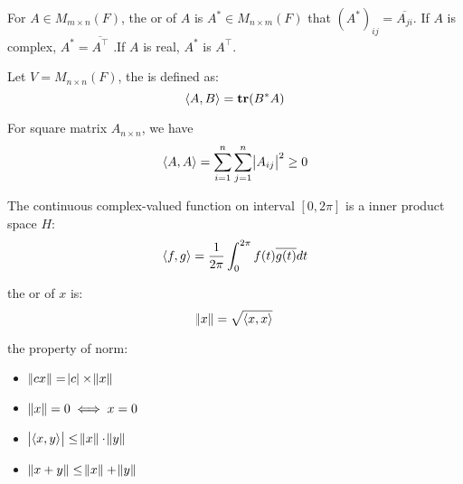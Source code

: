\begin{definition}
	For $A \in M_{m \times n}(F)$, the  or  of $A$ is $A^* \in M_{n \times m}(F)$ that $(A^*)_{ij} = \overline{A_{ji}}$. If $A$ is complex, $A^* = \overline{A^\top}$ .If $A$ is real, $A^*$ is $A^\top$.
\end{definition}

\begin{definition}
    Let $V=M_{n \times n} (F)$, the  is defined as:
    \begin{equation}
        \left\langle \displaystyle A, B \right\rangle = \displaystyle \mathbf{tr}( B^* A )
    \end{equation}
\end{definition}

\begin{theorem}
    For square matrix $A_{n \times n}$, we have 
    \begin{equation}
        \left\langle \displaystyle A, A \right\rangle = \sum_{i=1}^n \sum_{j=1}^n \abs{A_{ij}}^2 \geq 0
    \end{equation}
\end{theorem}


\begin{definition}\label{hinnerproductspace}
	The continuous complex-valued function on interval $[0, 2\pi]$ is a inner product space $H$:
	\begin{equation}
		\left\langle \displaystyle f, g \right\rangle = \frac{1}{2\pi} \int_{0}^{2\pi} f(t) \overline{g(t)} dt
	\end{equation}
\end{definition}


\begin{definition}
	the  or  of $x$ is:
	\begin{equation}
	    \norm{x} = \sqrt{\left\langle \displaystyle x, x \right\rangle}
	\end{equation}
\end{definition}

\begin{theorem}
	the property of norm:
	\begin{itemize}
		\item $\norm{cx} = \abs{c} \times \norm{x}$
		\item $\norm{x} = 0 \iff x = 0$
		\item {} $\abs{\left\langle \displaystyle x, y \right\rangle} \leq \norm{x} \cdot \norm{y}$
		\item {} $\norm{x+y} \leq \norm{x} + \norm{y}$
	\end{itemize}
\end{theorem}

